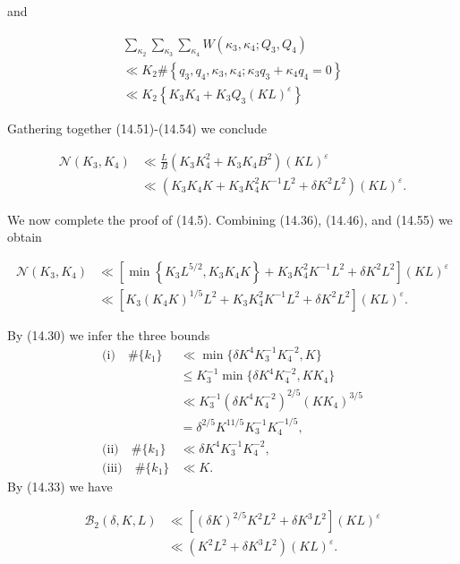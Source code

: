 \documentclass[10pt]{article}
\begin{document}
and


\begin{gather*}
\sum_{\kappa_{2}} \sum_{\kappa_{3}} \sum_{\kappa_{4}} W\left(\kappa_{3}, \kappa_{4} ; Q_{3}, Q_{4}\right) \\
\ll K_{2} \#\left\{q_{3}, q_{4}, \kappa_{3}, \kappa_{4} ; \kappa_{3} q_{3}+\kappa_{4} q_{4}=0\right\}  \tag{14.54}\\
\ll K_{2}\left\{K_{3}K_{4}+K_{3}Q_{3}(KL)^{\varepsilon}\right\}
\end{gather*}


Gathering together (14.51)-(14.54) we conclude


\begin{align*}
\mathscr{N}(K_{3},K_{4}) & \ll \frac{L}{B}\left(K_{3} K_{4}^{2}+K_{3} K_{4} B^{2}\right)(K L)^{\varepsilon} \\
& \ll\left(K_{3} K_{4} K+K_{3} K_{4}^{2} K^{-1} L^{2}+\delta K^{2} L^{2}\right)(K L)^{\varepsilon} . \tag{14.55}
\end{align*}


We now complete the proof of (14.5). Combining (14.36), (14.46), and (14.55) we obtain

$$
\begin{aligned}
\mathscr{N}(K_{3},K_{4}) & \ll\left[\min \left\{K_{3} L^{5 / 2}, K_{3} K_{4} K\right\}+K_{3} K_{4}^{2} K^{-1} L^{2}+\delta K^{2} L^{2}\right](K L)^{\varepsilon} \\
& \ll\left[K_{3}\left(K_{4} K\right)^{1 / 5} L^{2}+K_{3} K_{4}^{2} K^{-1} L^{2}+\delta K^{2} L^{2}\right](K L)^{\varepsilon} .
\end{aligned}
$$

By (14.30) we infer the three bounds
\begin{align*}
\text{(i)}\quad \#\{k_{1}\}
&\ll \min\{\delta K^{4}K_{3}^{-1}K_{4}^{-2},K\} \\
&\leqslant K_{3}^{-1}\min\{\delta K^{4}K_{4}^{-2},KK_{4}\} \\
&\ll K_{3}^{-1}\left(\delta K^{4}K_{4}^{-2}\right)^{2/5}
       \left(KK_{4}\right)^{3/5} \\
&=\delta^{2/5}K^{11/5}K_{3}^{-1}K_{4}^{-1/5},\\
\text{(ii)}\quad \#\{k_{1}\}
&\ll \delta K^{4}K_{3}^{-1}K_{4}^{-2},\\
\text{(iii)}\quad \#\{k_{1}\}
&\ll K.
\end{align*}
By (14.33) we have

$$
\begin{aligned}
\mathscr{B}_{2}(\delta, K, L) & \ll\left[(\delta K)^{2 / 5} K^{2} L^{2}+\delta K^{3} L^{2}\right](K L)^{\varepsilon} \\
& \ll\left(K^{2}L^{2}+\delta K^{3} L^{2}\right)(K L)^{\varepsilon} .
\end{aligned}
$$
\end{document}
